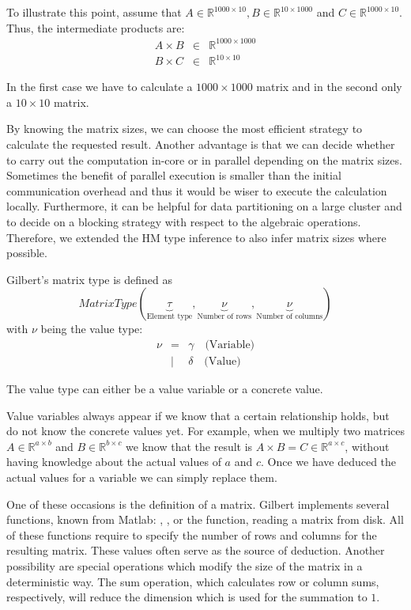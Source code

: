 To illustrate this point, assume that $A\in \mathbb{R}^{1000\times 10}, B\in \mathbb{R}^{10\times 1000}$ and $C \in \mathbb{R}^{1000\times 10}$.
Thus, the intermediate products are:
\begin{eqnarray*}
	A\times B &\in& \mathbb{R}^{1000 \times 1000}\\
	B\times C &\in& \mathbb{R}^{10 \times 10}
\end{eqnarray*}

In the first case we have to calculate a $1000 \times 1000$ matrix and in the second only a $10 \times 10$ matrix.

By knowing the matrix sizes, we can choose the most efficient strategy to calculate the requested result.
Another advantage is that we can decide whether to carry out the computation in-core or in parallel depending on the matrix sizes.
Sometimes the benefit of parallel execution is smaller than the initial communication overhead and thus it would be wiser to execute the calculation locally.
Furthermore, it can be helpful for data partitioning on a large cluster and to decide on a blocking strategy with respect to the algebraic operations.
Therefore, we extended the HM type inference to also infer matrix sizes where possible.

Gilbert's matrix type is defined as 
\begin{displaymath}
MatrixType(\underbrace{\tau}_{\text{Element type}},\underbrace{\nu}_{\text{Number of rows}},\underbrace{\nu}_{\text{Number of columns}})
\end{displaymath}
with $\nu$ being the value type:
\begin{eqnarray*}
	\nu &=& \gamma\quad\text{(Variable)} \\
	&|& \delta\quad\text{(Value)}
\end{eqnarray*}

The value type can either be a value variable or a concrete value.

Value variables always appear if we know that a certain relationship holds, but do not know the concrete values yet.
For example, when we multiply two matrices $A\in\mathbb{R}^{a\times b}$ and $B\in\mathbb{R}^{b\times c}$ we know that the result is $A\times B = C \in \mathbb{R}^{a\times c}$, without having knowledge about the actual values of $a$ and $c$.
Once we have deduced the actual values for a variable we can simply replace them.

One of these occasions is the definition of a matrix.
Gilbert implements several functions, known from Matlab: , ,  or the  function, reading a matrix from disk.
All of these functions require to specify the number of rows and columns for the resulting matrix.
These values often serve as the source of deduction.
Another possibility are special operations which modify the size of the matrix in a deterministic way.
The sum operation, which calculates row or column sums, respectively, will reduce the dimension which is used for the summation to $1$.

